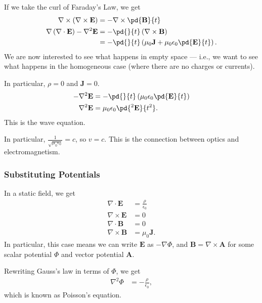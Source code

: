 \documentclass[10pt]{mypackage}
\begin{document}
\begin{derivation}
  If we take the curl of Faraday's Law, we get
  \begin{align*}
    \nabla \times \left(\nabla \times \mathbf{E}\right) &= -\nabla \times \pd{\mathbf{B}}{t}\\
    \nabla\left(\nabla \cdot \mathbf{E}\right) - \nabla^2\mathbf{E} &= -\pd{}{t}\left(\nabla \times \mathbf{B}\right)\\
                                                                    &= -\pd{}{t}\left(\mu_0\mathbf{J} + \mu_0\epsilon_0\pd{\mathbf{E}}{t}\right).
  \end{align*}
  We are now interested to see what happens in empty space --- i.e., we want to see what happens in the homogeneous case (where there are no charges or currents).\newline

  In particular, $\rho = 0$ and $\mathbf{J} = 0$.
  \begin{align*}
    -\nabla^2\mathbf{E} &= -\pd{}{t}\left(\mu_0\epsilon_0\pd{\mathbf{E}}{t}\right)\\
    \nabla^2\mathbf{E} &= \mu_0\epsilon_0\pd{^2\mathbf{E}}{t^2}.
  \end{align*}
  This is the wave equation.\newline

  In particular, $\frac{1}{\sqrt{\mu_0\epsilon_0}}= c$, so $v = c$. This is the connection between optics and electromagnetism.
\end{derivation}
\subsubsection{Substituting Potentials}%
In a static field, we get
\begin{align*}
  \nabla \cdot \mathbf{E} &= \frac{\rho}{\epsilon_0}\\
  \nabla \times \mathbf{E} &= 0\\
  \nabla \cdot \mathbf{B} &= 0\\
  \nabla \times \mathbf{B} &= \mu_0\mathbf{J}.
\end{align*}
In particular, this case means we can write $\mathbf{E}$ as $-\nabla\Phi$, and $\mathbf{B} = \nabla \times \mathbf{A}$ for some scalar potential $\Phi$ and vector potential $\mathbf{A}$.\newline

Rewriting Gauss's law in terms of $\Phi$, we get
\begin{align*}
  \nabla^2\Phi &= -\frac{\rho}{\epsilon_0},
\end{align*}
which is known as Poisson's equation.\newline
\end{document}
